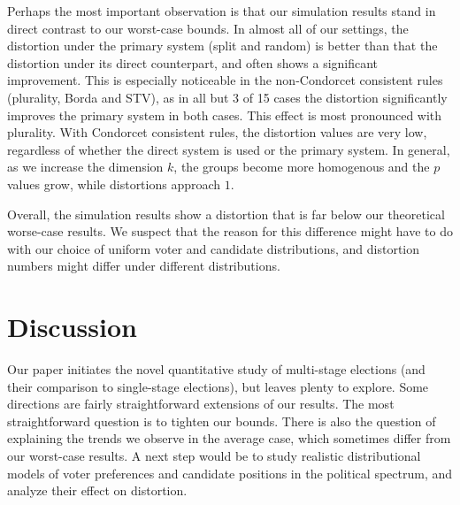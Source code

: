 \documentclass[letterpaper]{article} %
\theoremstyle{definition}
\begin{document}
Perhaps the most important observation is that our simulation results stand in direct contrast to our worst-case bounds. In almost all of our settings, the distortion under the primary system (split and random) is better than that the distortion under its direct counterpart, and often shows a significant improvement. This is especially noticeable in the non-Condorcet consistent rules (plurality, Borda and STV), as in all but 3 of 15 cases the distortion significantly improves the primary system in both cases. This effect is most pronounced with plurality. With Condorcet consistent rules, the distortion values are very low, regardless of whether the direct system is used or the primary system. In general, as we increase the dimension $k$, the groups become more homogenous and the $p$ values grow, while distortions  approach $1$.

Overall, the simulation results show a distortion that is far below our theoretical worse-case results. We suspect that the reason for this difference might have to do with our choice of uniform voter and candidate distributions, and distortion numbers might differ under different distributions.

\section{Discussion}



Our paper initiates the novel quantitative study of multi-stage elections (and their comparison to single-stage elections), but leaves plenty to explore. Some directions are fairly straightforward extensions of our results. The most straightforward question is to tighten our bounds. There is also the question of explaining the trends we observe in the average case, which sometimes differ from our worst-case results. A next step would be to study realistic distributional models of voter preferences and candidate positions in the political spectrum, and analyze their effect on distortion.
 
\end{document}
